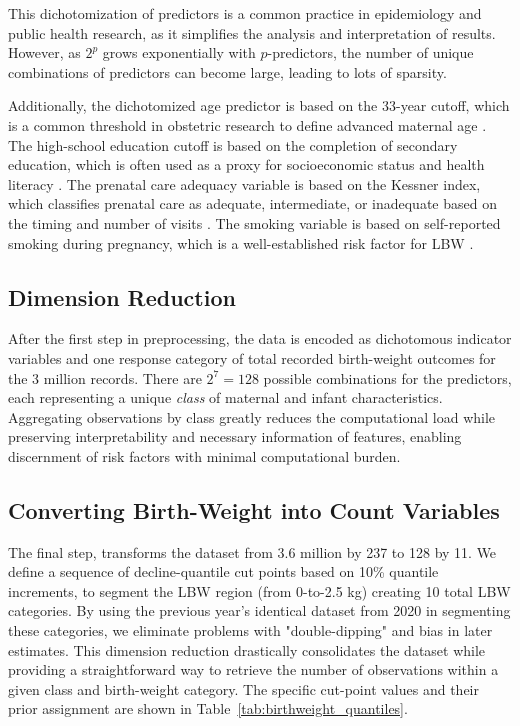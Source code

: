 This dichotomization of predictors is a common practice in epidemiology and public health research, as it simplifies the analysis and interpretation of results. However, as \(2^p\) grows exponentially with \(p\)-predictors, the number of unique combinations of predictors can become large, leading to lots of sparsity. 

Additionally, the dichotomized age predictor is based on the 33-year cutoff, which is a common threshold in obstetric research to define advanced maternal age \citep{advanced_maternal_age}. The high-school education cutoff is based on the completion of secondary education, which is often used as a proxy for socioeconomic status and health literacy \citep{education_health_literacy}. The prenatal care adequacy variable is based on the Kessner index, which classifies prenatal care as adequate, intermediate, or inadequate based on the timing and number of visits \citep{kessner_index}. The smoking variable is based on self-reported smoking during pregnancy, which is a well-established risk factor for LBW \citep{smoking_lbw}.

\subsection{Dimension Reduction}
\label{sec:ch2-dimension-reduction}

After the first step in preprocessing, the data is encoded as dichotomous indicator variables and one response category of total recorded birth-weight outcomes for the 3 million records. There are \(2^7 = 128\) possible combinations for the predictors, each representing a unique \emph{class} of maternal and infant characteristics. Aggregating observations by class greatly reduces the computational load while preserving interpretability and necessary information of features, enabling discernment of risk factors with minimal computational burden.

\subsection{Converting Birth-Weight into Count Variables} 
\label{sec:ch2-count-variables}

The final step, transforms the dataset from 3.6 million by 237 to 128 by 11. We define a sequence of decline-quantile cut points based on 10\% quantile increments, to segment the LBW region (from 0-to-2.5 kg) creating 10 total LBW categories. By using the previous year's identical dataset from 2020 in segmenting these categories, we eliminate problems with "double-dipping" and bias in later estimates. This dimension reduction drastically consolidates the dataset while providing a straightforward way to retrieve the number of observations within a given class and birth-weight category. The specific cut-point values and their prior assignment are shown in Table~\ref{tab:birthweight_quantiles}.

